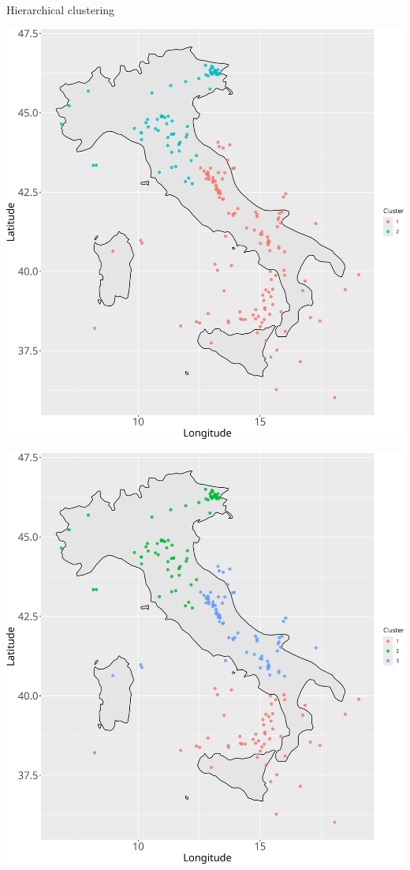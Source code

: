 \documentclass[aspectratio=43]{beamer}
\begin{document}
\begin{frame}{Hierarchical clustering}
	\centering
	\begin{minipage}{0.35\textwidth}
		\includegraphics[width=\textwidth]{EQ_images/clustering_2.png}
	\end{minipage}
	\hspace{0.05\textwidth}
	\begin{minipage}{0.35\textwidth}
		\includegraphics[width=\textwidth]{EQ_images/clustering_3.png}
	\end{minipage}
	

\end{frame}
\end{document}
